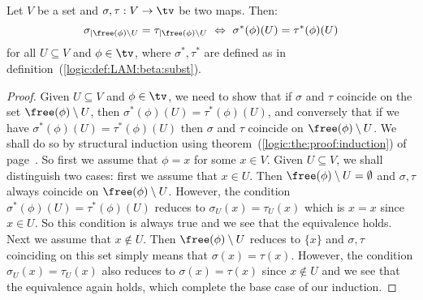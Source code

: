 \begin{prop}\label{logic:prop:LAM:freevar:beta:support:gen}
    Let $V$ be a set and $\sigma,\tau:V\to\tv$ be two maps. Then:
        \[
            \sigma_{|\free(\phi)\setminus U}=\tau_{|\free(\phi)\setminus U}
            \ \Leftrightarrow\ \sigma^{*}(\phi)(U)=\tau^{*}(\phi)(U)
        \]
    for all $U\subseteq V$ and $\phi\in\tv$, where $\sigma^{*},\tau^{*}$ are 
    defined as in definition~(\ref{logic:def:LAM:beta:subst}).
\end{prop}
\begin{proof}
    Given $U\subseteq V$ and $\phi\in\tv$, we need to show that if $\sigma$
    and $\tau$ coincide on the set $\free(\phi)\setminus U$, then 
    $\sigma^{*}(\phi)(U)=\tau^{*}(\phi)(U)$, and conversely that if 
    we have $\sigma^{*}(\phi)(U)=\tau^{*}(\phi)(U)$ then $\sigma$ and $\tau$ 
    coincide on $\free(\phi)\setminus U$. We shall do so by structural
    induction using theorem~(\ref{logic:the:proof:induction}) of
    page~\pageref{logic:the:proof:induction}. So first we assume that 
    $\phi=x$ for some $x\in V$. Given $U\subseteq V$, we shall distinguish 
    two cases: first we assume that $x\in U$. Then $\free(\phi)\setminus U=
    \emptyset$ and $\sigma, \tau$ always coincide on $\free(\phi)\setminus U$.
    However, the condition $\sigma^{*}(\phi)(U)=\tau^{*}(\phi)(U)$ reduces
    to $\sigma_{U}(x)=\tau_{U}(x)$ which is $x = x$ since $x\in U$. So this
    condition is always true and we see that the equivalence holds. Next
    we assume that $x\not\in U$. Then $\free(\phi)\setminus U$ reduces to 
    $\{x\}$ and $\sigma,\tau$ coinciding on this set simply means that 
    $\sigma(x) = \tau(x)$. However, the condition $\sigma_{U}(x)=\tau_{U}(x)$
    also reduces to $\sigma(x)=\tau(x)$ since $x\not\in U$ and we see that 
    the equivalence again holds, which complete the base case of our 
    induction.


\end{proof}
